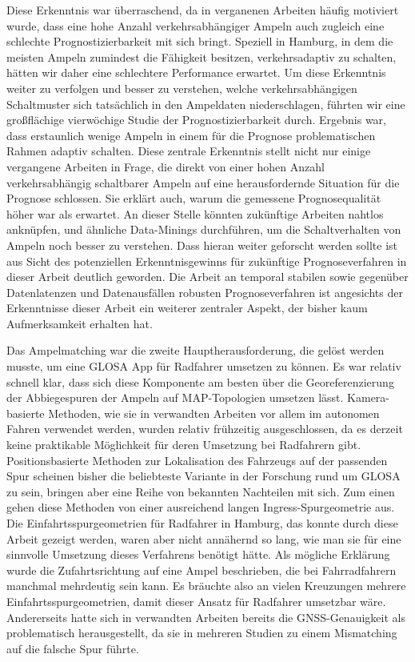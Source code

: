 Diese Erkenntnis war überraschend, da in verganenen Arbeiten häufig motiviert wurde, dass eine hohe Anzahl verkehrsabhängiger Ampeln auch zugleich eine schlechte Prognostizierbarkeit mit sich bringt. Speziell in Hamburg, in dem die meisten Ampeln zumindest die Fähigkeit besitzen, verkehrsadaptiv zu schalten, hätten wir daher eine schlechtere Performance erwartet. Um diese Erkenntnis weiter zu verfolgen und besser zu verstehen, welche verkehrsabhängigen Schaltmuster sich tatsächlich in den Ampeldaten niederschlagen, führten wir eine großflächige vierwöchige Studie der Prognostizierbarkeit durch. Ergebnis war, dass erstaunlich wenige Ampeln in einem für die Prognose problematischen Rahmen adaptiv schalten. Diese zentrale Erkenntnis stellt nicht nur einige vergangene Arbeiten in Frage, die direkt von einer hohen Anzahl verkehrsabhängig schaltbarer Ampeln auf eine herausfordernde Situation für die Prognose schlossen. Sie erklärt auch, warum die gemessene Prognosequalität höher war als erwartet. An dieser Stelle könnten zukünftige Arbeiten nahtlos anknüpfen, und ähnliche Data-Minings durchführen, um die Schaltverhalten von Ampeln noch besser zu verstehen. Dass hieran weiter geforscht werden sollte ist aus Sicht des potenziellen Erkenntnisgewinns für zukünftige Prognoseverfahren in dieser Arbeit deutlich geworden. Die Arbeit an temporal stabilen sowie gegenüber Datenlatenzen und Datenausfällen robusten Prognoseverfahren ist angesichts der Erkenntnisse dieser Arbeit ein weiterer zentraler Aspekt, der bisher kaum Aufmerksamkeit erhalten hat.

Das Ampelmatching war die zweite Hauptherausforderung, die gelöst werden musste, um eine GLOSA App für Radfahrer umsetzen zu können. Es war relativ schnell klar, dass sich diese Komponente am besten über die Georeferenzierung der Abbiegespuren der Ampeln auf MAP-Topologien umsetzen lässt. Kamera-basierte Methoden, wie sie in verwandten Arbeiten vor allem im autonomen Fahren verwendet werden, wurden relativ frühzeitig ausgeschlossen, da es derzeit keine praktikable Möglichkeit für deren Umsetzung bei Radfahrern gibt. Positionsbasierte Methoden zur Lokalisation des Fahrzeugs auf der passenden Spur scheinen bisher die beliebteste Variante in der Forschung rund um GLOSA zu sein, bringen aber eine Reihe von bekannten Nachteilen mit sich. Zum einen gehen diese Methoden von einer ausreichend langen Ingress-Spurgeometrie aus. Die Einfahrtsspurgeometrien für Radfahrer in Hamburg, das konnte durch diese Arbeit gezeigt werden, waren aber nicht annähernd so lang, wie man sie für eine sinnvolle Umsetzung dieses Verfahrens benötigt hätte. Als mögliche Erklärung wurde die Zufahrtsrichtung auf eine Ampel beschrieben, die bei Fahrradfahrern manchmal mehrdeutig sein kann. Es bräuchte also an vielen Kreuzungen mehrere Einfahrtsspurgeometrien, damit dieser Ansatz für Radfahrer umsetzbar wäre. Andererseits hatte sich in verwandten Arbeiten bereits die GNSS-Genauigkeit als problematisch herausgestellt, da sie in mehreren Studien zu einem Mismatching auf die falsche Spur führte.

